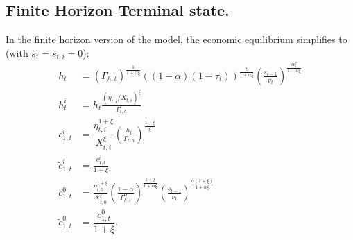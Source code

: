 \documentclass[a4paper]{article}
\begin{document}
\subsection{Finite Horizon Terminal state.}\label{\refsec:finitehorizon}

In the finite horizon version of the model, the economic equilibrium simplifies to (with $s_t = s_{t,i} = 0$):
\begin{subequations}\label{\refeq:TerminalEE}
\begin{align}
    h_t &= \left(\Gamma_{h,t}\right)^{\frac{1}{1+\alpha\xi}}\left((1-\alpha)(1-\tau_t)\right)^{\frac{\xi}{1+\alpha\xi}}\left(\frac{s_{t-1}}{\nu_t}\right)^{\frac{\alpha\xi}{1+\alpha\xi}} \\
    h_t^i &= h_t\frac{(\eta_{t,i}/X_{t,i})^{\xi}}{\Gamma_{t,h}} \\ 
    c_{1,t}^i &= \dfrac{\eta_{t,i}^{1+\xi}}{X_{t,i}^{\xi}}\left(\frac{h_t}{\Gamma_{t,h}}\right)^{\frac{1+\xi}{\xi}} \\ 
    \tilde{c}_{1,t}^i &= \frac{c_{1,t}^i}{1+\xi} \\
    c_{1,t}^0 &= \frac{\eta_{t,0}^{1+\xi}}{X_{t,0}^{\xi}}\left(\frac{1-\alpha}{\Gamma_{h,t}^{\alpha}}\right)^{\frac{1+\xi}{1+\alpha\xi}}\left(\frac{s_{t-1}}{\nu_t}\right)^{\frac{\alpha(1+\xi)}{1+\alpha\xi}} \\
    \tilde{c}_{1,t}^0 &= \dfrac{c_{1,t}^0}{1+\xi}.
\end{align}
\end{subequations}
\end{document}
